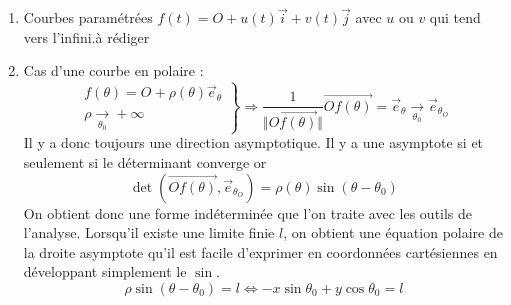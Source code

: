 \begin{exples}
\begin{enumerate}
 \item Courbes paramétrées $f(t)=O+u(t)\overrightarrow i +v(t)\overrightarrow j$ avec $u$ ou $v$ qui tend vers l'infini.à rédiger
 \item Cas d'une courbe en polaire : 
\begin{displaymath}
\left. 
\begin{aligned}
 f(\theta)=O+\rho(\theta)\overrightarrow{e}_{\theta}\\
\rho \xrightarrow[\theta_0]{} +\infty
\end{aligned}
\right\rbrace 
\Rightarrow \frac{1}{\Vert\overrightarrow{Of(\theta)} \Vert}\overrightarrow{Of(\theta)} = \overrightarrow{e}_{\theta} 
\xrightarrow[\theta_0]{} \overrightarrow{e}_{\theta_O}
\end{displaymath}
Il y a donc toujours une direction asymptotique. Il y a une asymptote si et seulement si le déterminant converge or
\begin{displaymath}
 \det(\overrightarrow{Of(\theta)},\overrightarrow{e}_{\theta_O}) = \rho(\theta)\sin(\theta - \theta_0)
\end{displaymath}
On obtient donc une forme indéterminée que l'on traite avec les outils de l'analyse. Lorsqu'il existe une limite finie $l$, on obtient une équation polaire de la droite asymptote qu'il est facile d'exprimer en coordonnées cartésiennes en développant simplement le $\sin$.
\begin{displaymath}
 \rho \sin(\theta -\theta_0) = l
\Leftrightarrow
-x\sin\theta_0 + y\cos\theta_0 = l
\end{displaymath}
\end{enumerate}
\end{exples}



